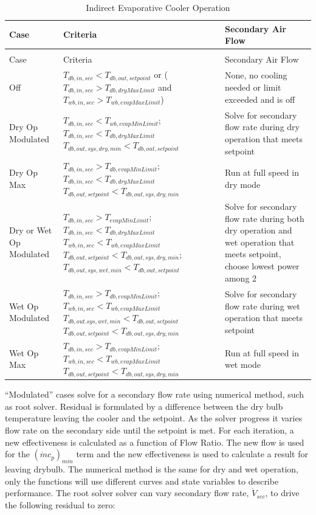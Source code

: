 \begin{longtable}[c]{@{}lll@{}}
\caption{Indirect Evaporative Cooler Operation \label{table:indirect-evaporative-cooler-operation}} \tabularnewline
\toprule 
Case & Criteria & Secondary Air Flow \tabularnewline
\midrule
\endfirsthead

\caption[]{Indirect Evaporative Cooler Operation} \tabularnewline
\toprule 
Case & Criteria & Secondary Air Flow \tabularnewline
\midrule
\endhead

Off & \(T_{db,in,sec}<T_{db,out,setpoint}\) or (\(T_{db,in,sec}>T_{db,dryMaxLimit}\) and \(T_{wb,in,sec}>T_{wb,evapMaxLimit}\)) & None, no cooling needed or limit exceeded and is off \tabularnewline
Dry Op Modulated & \(T_{db,in,sec}<T_{wb,evapMinLimit}\); \(T_{db,in,sec}<T_{db,dryMaxLimit}\) \(T_{db,out,sys,dry,min}<T_{db,out,setpoint}\) & Solve for secondary flow rate during dry operation that meets setpoint \tabularnewline
Dry Op Max & \(T_{db,in,sec}>T_{db,evapMinLimit}\); \(T_{db,in,sec}<T_{db,dryMaxLimit}\) \(T_{db,out,setpoint}<T_{db,out,sys,dry,min}\) & Run at full speed in dry mode \tabularnewline
Dry or Wet Op Modulated & \(T_{db,in,sec}>T_{evapMinLimit}\); \(T_{db,in,sec}<T_{db,dryMaxLimit}\) \(T_{wb,in,sec}<T_{wb,evapMaxLimit}\) \(T_{db,out,setpoint}<T_{db,out,sys,dry,min}\); \(T_{db,out,sys,wet,min}<T_{db,out,setpoint}\) & Solve for secondary flow rate during both dry operation and wet operation that meets setpoint, choose lowest power among 2 \tabularnewline
Wet Op Modulated & \(T_{db,in,sec}>T_{db,evapMinLimit}\); \(T_{wb,in,sec}<T_{wb,evapMaxLimit}\) \(T_{db,out.sys,wet,min}<T_{db,out,setpoint}\) \(T_{db,out,setpoint}<T_{db,out,sys,dry,min}\) & Solve for secondary flow rate during wet operation that meets setpoint \tabularnewline
Wet Op Max & \(T_{db,in,sec}>T_{db,evapMinLimit}\); \(T_{wb,in,sec}<T_{wb,evapMaxLimit}\) \(T_{db,out,setpoint}<T_{db,out,sys,dry,min}\) & Run at full speed in wet mode \tabularnewline
\bottomrule
\end{longtable}


``Modulated'' cases solve for a secondary flow rate using numerical method, such as root solver. Residual is formulated by a difference between the dry bulb temperature leaving the cooler and the setpoint. As the solver progress it varies flow rate on the secondary side until the setpoint is met. For each iteration, a new effectiveness is calculated as a function of Flow Ratio. The new flow is used for the \(\left(\dot{m}c_{p}\right)_{min}\) term and the new effectiveness is used to calculate a result for leaving drybulb. The numerical method is the same for dry and wet operation, only the functions will use different curves and state variables to describe performance. The root solver solver can vary secondary flow rate, \(\dot{V}_{sec}\), to drive the following residual to zero:

